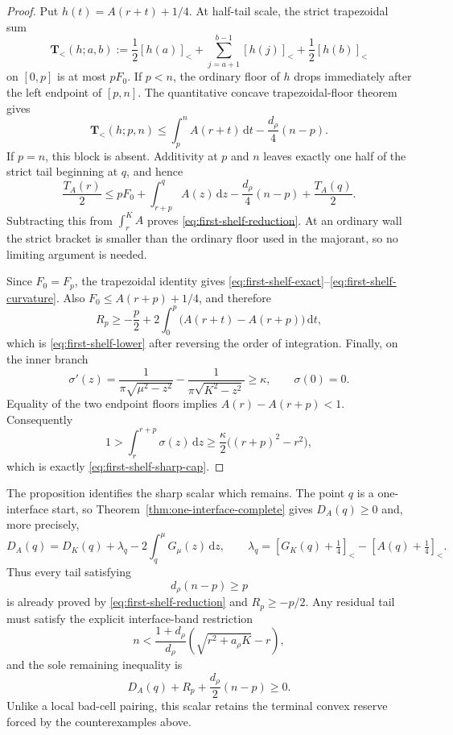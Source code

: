\documentclass[11pt]{article}
\theoremstyle{remark}
\newcommand{\sbr}[1]{[#1]_{<}}
\newcommand{\dd}{\,\mathrm d}
\begin{document}
\begin{proof}
Put $h(t)=A(r+t)+1/4$.  At half-tail scale, the strict trapezoidal
sum
\[
 \mathbf T_{<}(h;a,b)
 :=\frac12\sbr{h(a)}+
 \sum_{j=a+1}^{b-1}\sbr{h(j)}+\frac12\sbr{h(b)}
\]
on $[0,p]$ is at most $pF_0$.  If $p<n$, the ordinary floor of $h$
drops immediately after the left endpoint of $[p,n]$.  The quantitative
concave trapezoidal-floor theorem \cite[Theorem~1.4]{FLPSannuli} gives
\[
 \mathbf T_{<}(h;p,n)
 \leq\int_p^n A(r+t)\dd t-\frac{d_\rho}{4}(n-p).
\]
If $p=n$, this block is absent.  Additivity at $p$ and $n$ leaves exactly
one half of the strict tail beginning at $q$, and hence
\[
 \frac{T_A(r)}2
 \leq pF_0+\int_{r+p}^qA(z)\dd z
 -\frac{d_\rho}{4}(n-p)+\frac{T_A(q)}2.
\]
Subtracting this from $\int_r^KA$ proves
\eqref{eq:first-shelf-reduction}.  At an ordinary wall the strict bracket
is smaller than the ordinary floor used in the majorant, so no limiting
argument is needed.

Since $F_0=F_p$, the trapezoidal identity gives
\eqref{eq:first-shelf-exact}--\eqref{eq:first-shelf-curvature}.  Also
$F_0\leq A(r+p)+1/4$, and therefore
\[
 R_p\geq-\frac p2
 +2\int_0^p\bigl(A(r+t)-A(r+p)\bigr)\dd t,
\]
which is \eqref{eq:first-shelf-lower} after reversing the order of
integration.  Finally, on the inner branch
\[
 \sigma'(z)=\frac1{\pi\sqrt{\mu^2-z^2}}
 -\frac1{\pi\sqrt{K^2-z^2}}\geq\kappa,
 \qquad \sigma(0)=0.
\]
Equality of the two endpoint floors implies
$A(r)-A(r+p)<1$.  Consequently
\[
 1>\int_r^{r+p}\sigma(z)\dd z
 \geq\frac\kappa2\bigl((r+p)^2-r^2\bigr),
\]
which is exactly \eqref{eq:first-shelf-sharp-cap}.
\end{proof}

The proposition identifies the sharp scalar which remains.  The point
$q$ is a one-interface start, so Theorem~\ref{thm:one-interface-complete}
gives $D_A(q)\geq0$ and, more precisely,
\begin{equation}
 D_A(q)=D_K(q)+\lambda_q-2\int_q^\mu G_\mu(z)\dd z,
 \qquad
 \lambda_q=
 \sbr{G_K(q)+\tfrac14}-\sbr{A(q)+\tfrac14}.
 \label{eq:first-shelf-terminal-identity}
\end{equation}
Thus every tail satisfying
\begin{equation}
 d_\rho(n-p)\geq p
 \label{eq:first-shelf-long-head}
\end{equation}
is already proved by
\eqref{eq:first-shelf-reduction} and $R_p\geq-p/2$.  Any residual tail
must satisfy the explicit interface-band restriction
\begin{equation}
 n<\frac{1+d_\rho}{d_\rho}
 \left(\sqrt{r^2+a_\rho K}-r\right),
 \label{eq:first-shelf-residual-band}
\end{equation}
and the sole remaining inequality is
\begin{equation}
 \boxed{
 D_A(q)+R_p+\frac{d_\rho}{2}(n-p)\geq0.}
 \label{eq:terminal-shelf-scalar}
\end{equation}
Unlike a local bad-cell pairing, this scalar retains the terminal convex
reserve forced by the counterexamples above.
\end{document}
